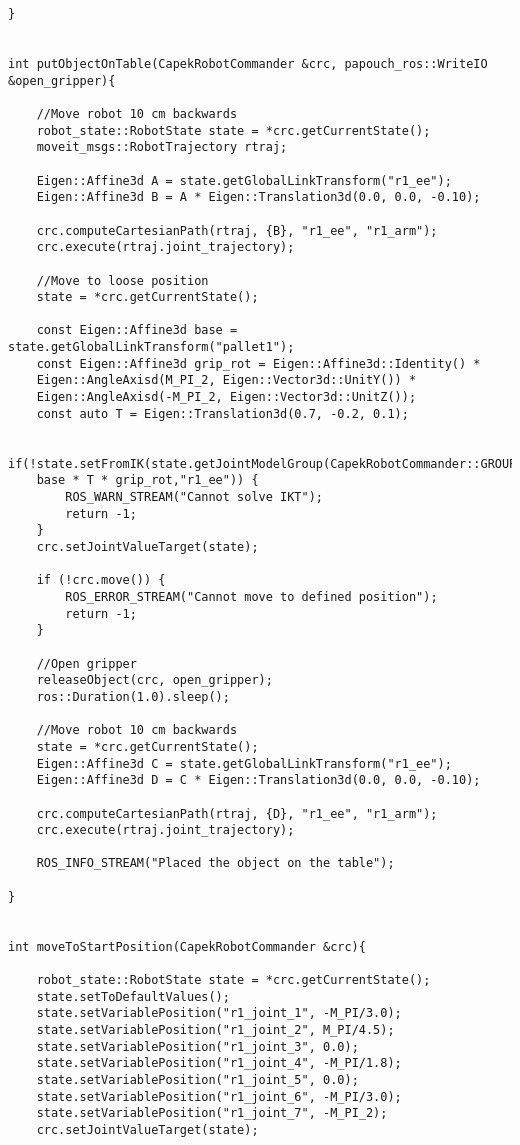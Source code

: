 \begin{lstlisting}
}


int putObjectOnTable(CapekRobotCommander &crc, papouch_ros::WriteIO &open_gripper){

	//Move robot 10 cm backwards
	robot_state::RobotState state = *crc.getCurrentState();
	moveit_msgs::RobotTrajectory rtraj;

	Eigen::Affine3d A = state.getGlobalLinkTransform("r1_ee");
	Eigen::Affine3d B = A * Eigen::Translation3d(0.0, 0.0, -0.10);
	
	crc.computeCartesianPath(rtraj, {B}, "r1_ee", "r1_arm");
	crc.execute(rtraj.joint_trajectory);

	//Move to loose position
	state = *crc.getCurrentState();

	const Eigen::Affine3d base = state.getGlobalLinkTransform("pallet1");
	const Eigen::Affine3d grip_rot = Eigen::Affine3d::Identity() * 
	Eigen::AngleAxisd(M_PI_2, Eigen::Vector3d::UnitY()) * 
	Eigen::AngleAxisd(-M_PI_2, Eigen::Vector3d::UnitZ());
	const auto T = Eigen::Translation3d(0.7, -0.2, 0.1);

	if(!state.setFromIK(state.getJointModelGroup(CapekRobotCommander::GROUP_R1_ARM),
	base * T * grip_rot,"r1_ee")) {
		ROS_WARN_STREAM("Cannot solve IKT");
		return -1;
	}
	crc.setJointValueTarget(state);

	if (!crc.move()) {
		ROS_ERROR_STREAM("Cannot move to defined position");
		return -1;
	}
	
	//Open gripper
	releaseObject(crc, open_gripper);
	ros::Duration(1.0).sleep();

	//Move robot 10 cm backwards
	state = *crc.getCurrentState();
	Eigen::Affine3d C = state.getGlobalLinkTransform("r1_ee");
	Eigen::Affine3d D = C * Eigen::Translation3d(0.0, 0.0, -0.10);

	crc.computeCartesianPath(rtraj, {D}, "r1_ee", "r1_arm");
	crc.execute(rtraj.joint_trajectory);

	ROS_INFO_STREAM("Placed the object on the table");

}


int moveToStartPosition(CapekRobotCommander &crc){

	robot_state::RobotState state = *crc.getCurrentState();
	state.setToDefaultValues();
	state.setVariablePosition("r1_joint_1", -M_PI/3.0);
	state.setVariablePosition("r1_joint_2", M_PI/4.5);
	state.setVariablePosition("r1_joint_3", 0.0);
	state.setVariablePosition("r1_joint_4", -M_PI/1.8);
	state.setVariablePosition("r1_joint_5", 0.0);
	state.setVariablePosition("r1_joint_6", -M_PI/3.0);
	state.setVariablePosition("r1_joint_7", -M_PI_2);
	crc.setJointValueTarget(state);


\end{lstlisting}
